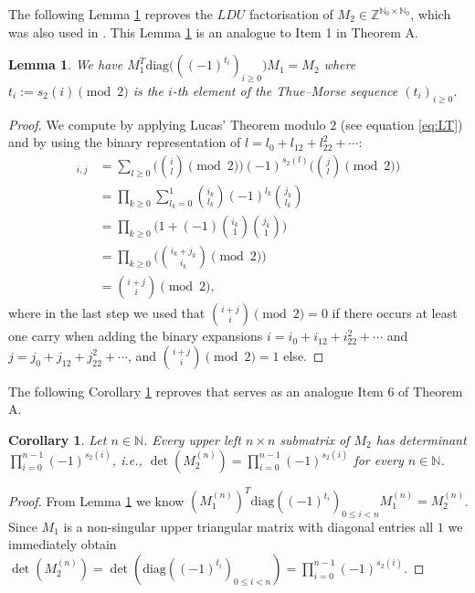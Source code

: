 \documentclass{article}
\newcommand{\NN}{\mathbb N}
\newcommand{\RR}{\mathbb R}
\newcommand{\ZZ}{\mathbb Z}
\newcommand{\diag}{\mathrm{ diag}}
\newtheorem{coro}{Corollary}
\newtheorem{lemma}{Lemma}
\begin{document}
	
	The following Lemma \ref{cor:1} reproves the $LDU$ factorisation of $M_2\in\ZZ^{\NN_0\times \NN_0}$, which was also used in \cite{mereb}. This Lemma \ref{cor:1} is an analogue to Item 1 in Theorem A. 
\begin{lemma}\label{cor:1}
We have $M_1^T\diag\big(((-1)^{t_i})_{i\geq 0}\big) M_1=M_2$ where $t_i:=s_2(i)\pmod{2}$ is the $i$-th element of the Thue--Morse sequence $(t_i)_{i\geq 0}$. 
\end{lemma}
\begin{proof}
We compute by applying Lucas' Theorem modulo $2$ (see equation \eqref{eq:LT}) and by using the binary representation of $l=l_0+l_12+l_22^2+\cdots$:
\begin{align*}
[M_1^T\diag\big((-1)^{t_i})_{i\geq 0}\big) M_1]_{i,j}&=\sum_{l\geq 0}\Big(\binom{i}{l}\pmod{2}\Big)(-1)^{s_2(l)}\Big(\binom{j}{l}\pmod{2}\Big)\\
&=\prod_{k\geq 0}\sum_{l_k=0}^1\binom{i_k}{l_k}(-1)^{l_k} \binom{j_k}{l_k}\\
&=\prod_{k\geq 0}\Big(1+(-1)\binom{i_k}{1}\binom{j_k}{1}\Big)\\
&=\prod_{k\geq 0}\big(\binom{i_k+j_k}{i_k}\pmod{2}\big)\\
&=\binom{i+j}{i}\pmod 2,
\end{align*}
where in the last step we used that $\binom{i+j}{i}\pmod 2=0$ if there occurs at least one carry when adding the binary expansions $i=i_0+i_12+i_22^2+\cdots$ and $j=j_0+j_12+j_22^2+\cdots$, and $\binom{i+j}{i}\pmod 2=1$ else. 

\end{proof}


The following Corollary \ref{cor:2} reproves \cite[Theorem~1.1]{BaCh} that serves as an analogue Item 6 of Theorem A. 
\begin{coro}\label{cor:2} Let $n\in\NN$. Every upper left $n\times n$ submatrix of $M_2$ has determinant $\prod_{i=0}^{n-1}(-1)^{s_2(i)}$, i.e., $\det(M_2^{(n)})=\prod_{i=0}^{n-1}(-1)^{s_2(i)}$ for every $n\in\NN$.\end{coro} 

\begin{proof}%
From Lemma \ref{cor:1} we know $(M_1^{(n)})^T\diag((-1)^{t_i})_{0\leq i<n} M_1^{(n)}=M_2^{(n)}$. Since $M_1$ is a non-singular upper triangular matrix with diagonal entries all $1$ we immediately obtain $\det(M_2^{(n)})=\det(\diag((-1)^{t_i})_{0\leq i<n})=\prod_{i=0}^{n-1}(-1)^{s_2(i)}$. 
\end{proof}
\end{document}
